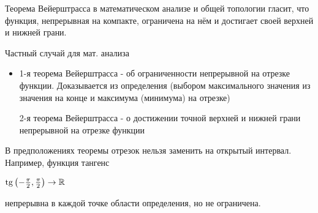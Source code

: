 Теорема Вейерштрасса в математическом анализе и общей топологии гласит, что функция, непрерывная на компакте, ограничена на нём и достигает своей верхней и нижней грани.

Частный случай для мат. анализа

\begin{itemize}
\item 
1-я теорема Вейерштрасса - об ограниченности непрерывной на отрезке функции.
Доказывается из определения (выбором максимального значения 
из значения на конце и максимума (минимума) на отрезке)

2-я теорема Вейерштрасса - о достижении точной верхней и нижней грани непрерывной на отрезке функции

\end{itemize}
В предположениях теоремы отрезок нельзя заменить на открытый интервал. Например, функция тангенс

$ \operatorname{tg} \left( -\frac{\pi}{2} , \frac{\pi}{2} \right) \to \mathbb{R} $

непрерывна в каждой точке области определения, но не ограничена.
